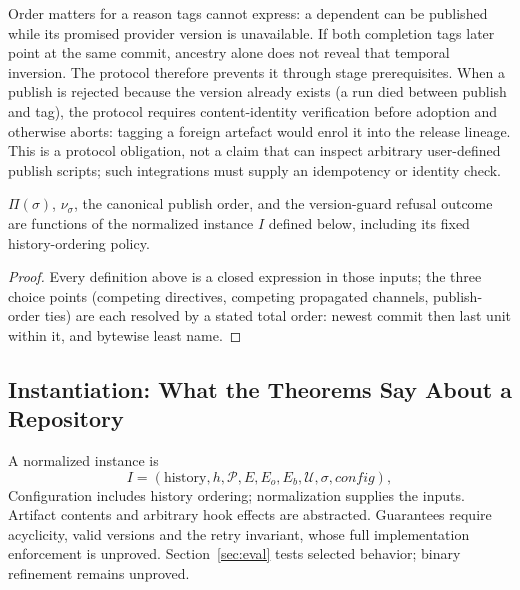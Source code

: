 Order matters for a reason tags cannot express: a dependent can be published
while its promised provider version is unavailable. If both completion tags
later point at the same commit, ancestry alone does not reveal that temporal
inversion. The protocol therefore prevents it through stage prerequisites. When a
publish is rejected because the version already exists (a run died
between publish and tag), the protocol requires content-identity verification
before adoption and otherwise aborts: tagging a foreign artefact would enrol
it into the release lineage. This is a protocol obligation, not a claim that
\tool{} can inspect arbitrary user-defined publish scripts; such integrations
must supply an idempotency or identity check.

\begin{theorem}[determinism]
\label{thm:det}
$\Pi(\sigma)$, $\nu_\sigma$, the canonical publish order, and the
version-guard refusal outcome are functions of the normalized instance $I$
defined below, including its fixed history-ordering policy.
\end{theorem}
\begin{proof}
Every definition above is a closed expression in those inputs; the three
choice points (competing directives, competing propagated channels,
publish-order ties) are each resolved by a stated total order: newest
commit then last unit within it, and bytewise least name.
\end{proof}

\subsection{Instantiation: What the Theorems Say About a Repository}
\label{sec:model:inst}

A normalized instance is
\[
 I=(\text{history},h,\mathcal P,E,E_o,E_b,\mathcal U,\sigma,\mathit{config}),
\]
Configuration includes history ordering; normalization supplies the inputs.
Artifact contents and arbitrary hook effects are abstracted. Guarantees require
acyclicity, valid versions and the retry invariant, whose full implementation
enforcement is unproved. Section~\ref{sec:eval} tests selected behavior;
binary refinement remains unproved.
